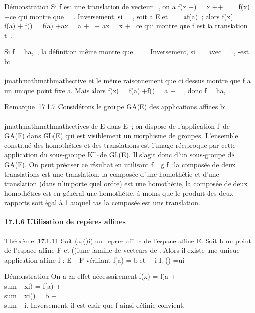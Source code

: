 Démonstration Si f est une translation de vecteur
\overrightarrow\xi~, on a f(x
+\overrightarrow \eta) = x
+\overrightarrow \eta +\overrightarrow
\xi~ = f(x) +\overrightarrow \eta ce qui montre que
\vecf = \mathrmId. Inversement, si
\vecf = \mathrmId, soit a \in E et
\overrightarrow\xi~ =\overrightarrow
af(a)~; alors f(x) = f(a) +\vec
f(\overrightarrowax) = f(a)
+\overrightarrow ax = a
+\overrightarrow \xi~ +\overrightarrow
ax = x +\overrightarrow \xi~ ce qui montre que f est
la translation t\overrightarrow\xi~.

Si f = ha,\lambda~, la définition même montre que
\vecf = \lambda~\mathrmId. Inversement,
si \vecf = \lambda~\mathrmId avec
\lambda~\neq~1, \vecf
-\mathrmId est bi\\\\jmathmathmathmathective et le même raisonnement que
ci dessus montre que f a un unique point fixe a. Mais alors f(x) = f(a)
+\vec f(\overrightarrowax) = a + \lambda~
\overrightarrowax, donc f = ha,\lambda~.

Remarque~17.1.7 Considérons le groupe GA(E) des applications affines
bi\\\\jmathmathmathmathectives de E dans E~; on dispose de l'application
f\mapsto~\vecf de GA(E) dans
GL(E) qui est visiblement un morphisme de groupes. L'ensemble constitué
des homothéties et des translations est l'image réciproque par cette
application du sous-groupe K^∗\mathrmId de
GL(E). Il s'agit donc d'un sous-groupe de GA(E). On peut préciser ce
résultat en utilisant \overrightarrowg \cdot f
=\vec g \cdot\vec f~:la composée de
deux translations est une translation, la composée d'une homothétie et
d'une translation (dans n'importe quel ordre) est une homothétie, la
composée de deux homothéties est en général une homothétie, à moins que
le produit des deux rapports soit égal à 1 auquel cas la composée est
une translation.

\paragraph{17.1.6 Utilisation de repères affines}

Théorème~17.1.11 Soit
(a,(\vecei)i\inI) un repère affine
de l'espace affine E. Soit b un point de l'espace affine F et
(\vecui)i\inI une famille de
vecteurs de \overrightarrowF. Alors il existe une
unique application affine f : E \rightarrow~ F vérifiant f(a) = b et
\forall~~i \in I,
\vecf(\vecei)
=\vec ui.

Démonstration On a en effet nécessairement f(x) = f(a
+ \\sum ~
xi\vecei) = f(a)
+ \\sum ~
xi\vecf(\vecei)
= b + \\sum ~
i\inIxi\vecui. Inversement,
il est clair que f ainsi définie convient.


